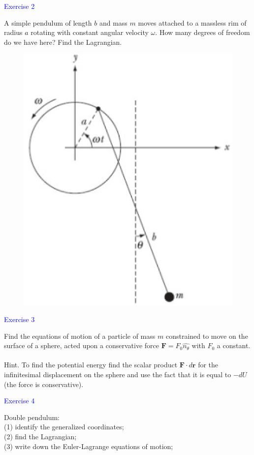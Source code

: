 \documentclass{beamer}
\begin{document}
\begin{frame}
\textcolor{blue}{Exercise 2}

A simple pendulum of length $b$ and mass $m$ moves attached to a massless rim of radius $a$ rotating with
constant angular velocity $\omega$. How many degrees of freedom do we have here? Find the Lagrangian.
\begin{figure}[htbp]
\centering
\includegraphics[width=0.4 \linewidth, angle =0]{ex2.png}
\label{fig:2}
\end{figure}
\end{frame}

\begin{frame}
\textcolor{blue}{Exercise 3}

Find the equations of motion of a particle of mass $m$ constrained to move on the surface of a sphere, acted upon a conservative force $\mathbf{F}=F_0\hat{n_\theta}$ with $F_0$ a constant.\\\
~\\
Hint. To find the potential energy find the scalar product $\mathbf{F}\cdot d\mathbf{r}$ for the infinitesimal displacement on the sphere and use the fact that it is equal to $-dU$ (the force is conservative).
\end{frame}
\begin{frame}
\textcolor{blue}{Exercise 4}

Double pendulum:\\
(1) identify the generalized coordinates;\\
(2) find the Lagrangian;\\ 
(3) write down the Euler-Lagrange equations of motion;
\begin{center}
\end{center}
\end{frame}
\end{document}
